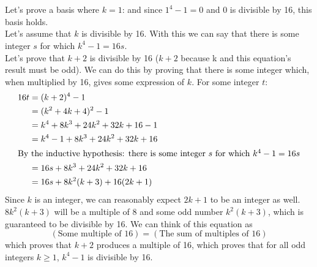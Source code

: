 \documentclass{article}
\begin{document}
\section{}
Let's prove a basis where $k=1$: and since $1^4 -1 = 0$ and 0 is divisible by 16, this basis holds.\\
Let's assume that $k$ is divisible by 16. With this we can say that there is some integer $s$ for which $k^4 - 1 = 16s$.\\
Let's prove that $k+2$ is divisible by 16 ($k+2$ because k and this equation's result must be odd). We can do this by proving that there is some integer which, when multiplied by 16, gives some expression of $k$. For some integer $t$:
\begin{align*}
            16t &= (k+2)^4 - 1 \\
                &= (k^2 + 4k + 4)^2 - 1 \\
                &= k^4 + 8k^3 + 24k^2 + 32k + 16 - 1 \\
                &= k^4 - 1 + 8k^3 + 24k^2 + 32k + 16 \\
\intertext{By the inductive hypothesis: there is some integer $s$ for which $k^4 - 1 = 16s$}
                &= 16s + 8k^3 + 24k^2 + 32k + 16 \\
                &= 16s + 8k^2(k+3) + 16(2k+1)
\end{align*}
Since $k$ is an integer, we can reasonably expect $2k+1$ to be an integer as well. $8k^2(k+3)$ will be a multiple of 8 and some odd number $k^2(k+3)$, which is guaranteed to be divisible by 16. We can think of this equation as
\begin{equation*}
    (\text{Some multiple of 16}) = (\text{The sum of multiples of 16})
\end{equation*}
which proves that $k+2$ produces a multiple of 16, which proves that for all odd integers $k \geq 1$, $k^4 - 1$ is divisible by 16.
\end{document}
